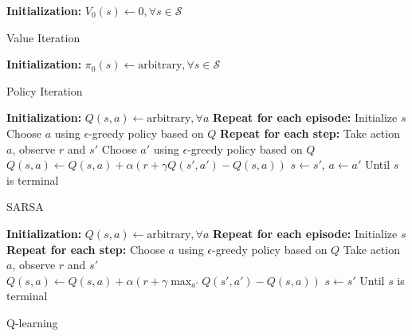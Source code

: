 \documentclass[conf]{new-aiaa}
\begin{document}
\begin{algorithm}[H]
\SetAlgoLined
{}
\textbf{Initialization:} $V_0(s) \gets 0, \forall s \in \mathcal{S}$\;
\caption{Value Iteration}
\end{algorithm}

\begin{algorithm}[H]
\SetAlgoLined
{}
\textbf{Initialization:} $\pi_0(s) \gets \text{arbitrary}, \forall s \in \mathcal{S}$\;
\caption{Policy Iteration}
\end{algorithm}


\begin{algorithm}[H]
\SetAlgoLined
{}
\textbf{Initialization:} $Q(s,a) \gets \text{arbitrary}, \forall a$\;
\textbf{Repeat for each episode:}\;
\quad Initialize $s$\;
\quad Choose $a$ using $\epsilon$-greedy policy based on $Q$\;
\quad \textbf{Repeat for each step:}\;
\quad \quad Take action $a$, observe $r$ and $s'$\;
\quad \quad Choose $a'$ using $\epsilon$-greedy policy based on $Q$\;
\quad \quad $Q(s,a) \gets Q(s,a) + \alpha (r + \gamma Q(s',a') - Q(s,a))$\;
\quad \quad $s \gets s'$, $a \gets a'$\;
\quad Until $s$ is terminal\;
\caption{SARSA}
\end{algorithm}



\begin{algorithm}[H]
\SetAlgoLined
{}
\textbf{Initialization:} $Q(s,a) \gets \text{arbitrary}, \forall a$\;
\textbf{Repeat for each episode:}\;
\quad Initialize $s$\;
\quad \textbf{Repeat for each step:}\;
\quad \quad Choose $a$ using $\epsilon$-greedy policy based on $Q$\;
\quad \quad Take action $a$, observe $r$ and $s'$\;
\quad \quad $Q(s,a) \gets Q(s,a) + \alpha (r + \gamma \max_{a'} Q(s',a') - Q(s,a))$\;
\quad \quad $s \gets s'$\;
\quad Until $s$ is terminal\;
\caption{Q-learning}
\end{algorithm}
\end{document}
